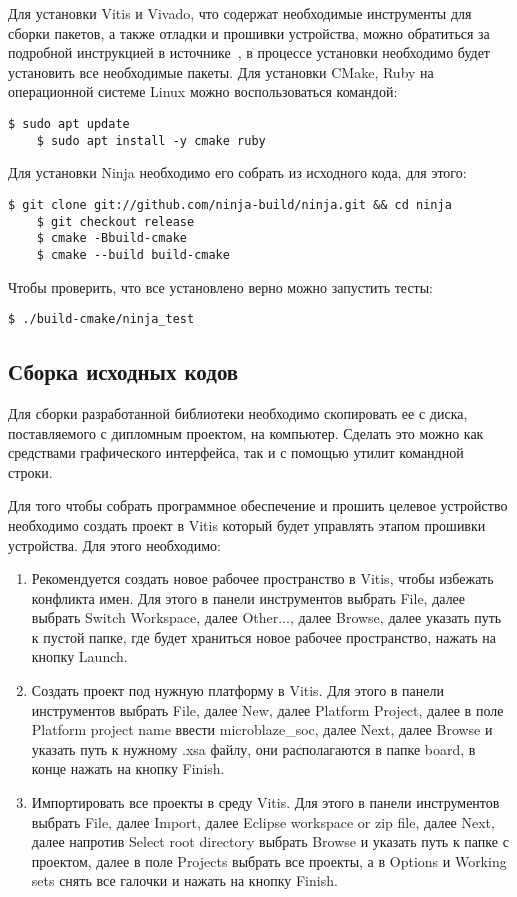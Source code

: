 Для установки Vitis и Vivado, что содержат необходимые инструменты для сборки пакетов, а также отладки и прошивки устройства, можно
обратиться за подробной инструкцией в источнике~\cite{install_vitis, install_vivado}, в процессе установки необходимо будет установить
все необходимые пакеты. Для установки CMake, Ruby на операционной системе Linux можно воспользоваться командой:
\begin{lstlisting}[basicstyle=\ttfamily\small]
    $ sudo apt update
    $ sudo apt install -y cmake ruby
\end{lstlisting}

Для установки Ninja необходимо его собрать из исходного кода, для этого:
\begin{lstlisting}[basicstyle=\ttfamily\small]
    $ git clone git://github.com/ninja-build/ninja.git && cd ninja
    $ git checkout release
    $ cmake -Bbuild-cmake
    $ cmake --build build-cmake
\end{lstlisting}

Чтобы проверить, что все установлено верно можно запустить тесты: 
\begin{lstlisting}[basicstyle=\ttfamily\small]
    $ ./build-cmake/ninja_test
\end{lstlisting}

\subsection{Сборка исходных кодов}

Для сборки разработанной библиотеки необходимо скопировать ее с диска, поставляемого
с дипломным проектом, на компьютер. Сделать это можно как средствами
графического интерфейса, так и с помощью утилит командной строки.

Для того чтобы собрать программное обеспечение и прошить целевое устройство необходимо создать проект в Vitis который будет управлять этапом прошивки устройства. Для
этого необходимо:

\begin{enumerate}
    \item Рекомендуется создать новое рабочее пространство в Vitis, чтобы избежать конфликта имен. 
    Для этого в панели инструментов выбрать File, далее выбрать Switch Workspace, далее Other..., 
    далее Browse, далее указать путь к пустой папке, где будет храниться новое рабочее пространство, нажать на кнопку Launch.
    \item Создать проект под нужную платформу в Vitis. Для этого в панели инструментов выбрать File, далее New, далее Platform Project, далее в 
    поле Platform project name ввести microblaze\_soc, далее Next, далее Browse и указать путь к нужному .xsa файлу, 
    они располагаются в папке board, в конце нажать на кнопку Finish.
    \item Импортировать все проекты в среду Vitis. Для этого в панели инструментов выбрать File, далее Import, далее Eclipse workspace or zip file, далее Next, далее
    напротив Select root directory выбрать Browse и указать путь к  папке с проектом, далее в поле Projects выбрать все проекты, а в Options 
    и Working sets снять все галочки и нажать на кнопку Finish.
\end{enumerate}

